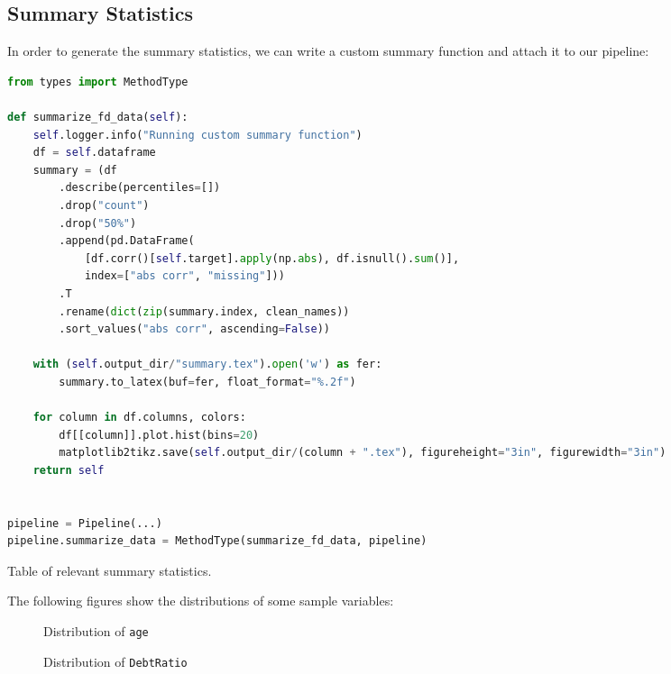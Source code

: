 \documentclass[11pt]{article}
\begin{document}
\subsection{Summary Statistics}
In order to generate the summary statistics, we can write a custom summary function and attach it to our pipeline:

\begin{lstlisting}[language=Python, numbers=none]
from types import MethodType

def summarize_fd_data(self):
    self.logger.info("Running custom summary function")
    df = self.dataframe
    summary = (df
        .describe(percentiles=[])
        .drop("count")
        .drop("50%")
        .append(pd.DataFrame(
            [df.corr()[self.target].apply(np.abs), df.isnull().sum()], 
            index=["abs corr", "missing"]))
        .T
        .rename(dict(zip(summary.index, clean_names))
        .sort_values("abs corr", ascending=False))

    with (self.output_dir/"summary.tex").open('w') as fer:
        summary.to_latex(buf=fer, float_format="%.2f")

    for column in df.columns, colors:
        df[[column]].plot.hist(bins=20)
        matplotlib2tikz.save(self.output_dir/(column + ".tex"), figureheight="3in", figurewidth="3in")
    return self


pipeline = Pipeline(...)
pipeline.summarize_data = MethodType(summarize_fd_data, pipeline)

\end{lstlisting}
\begin{table}[H]
\centering \renewcommand{\arraystretch}{1.2}

\caption{Table of relevant summary statistics.}\label{summary}
\end{table}

The following figures show the distributions of some sample variables:

\begin{minipage}{0.45\textwidth}
\vspace{10.5pt}
\begin{figure}[H]

\vspace{5pt}
\caption{Distribution of \texttt{age}}
\end{figure}
\end{minipage}\hfill
\begin{minipage}{0.45\textwidth}
\vspace{0pt}
\begin{figure}[H]

\caption{Distribution of \texttt{DebtRatio}}
\end{figure}
\end{minipage}
\end{document}
